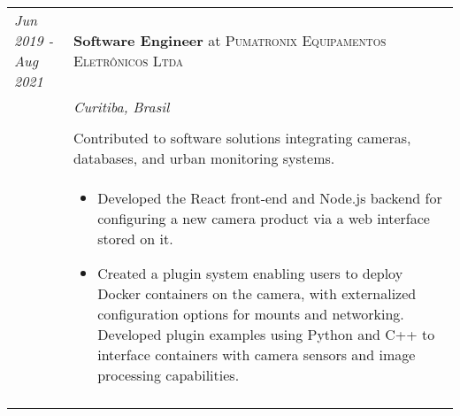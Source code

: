 \documentclass[a4paper,10pt]{article}
\begin{document}
    \begin{tabular}{@{} p{2.8cm} | p{12.2cm} @{}}
        \emph{Jun 2019 - Aug 2021}
        &\textbf{Software Engineer} at \textsc
        {Pumatronix Equipamentos Eletrônicos Ltda} \\

        &\emph
        {Curitiba, Brasil} \\ \\
        &\normalsize
        {
            Contributed to software solutions integrating cameras,
            databases, and urban monitoring systems.
        } \\
        & \begin{itemize}[leftmargin=*]
            \item Developed the React front-end and Node.js backend for
                configuring a new camera product via a web interface
                stored on it.

            \item Created a plugin system enabling users to deploy Docker
                containers on the camera, with externalized configuration
                options for mounts and networking. Developed plugin examples
                using Python and C++ to interface containers with camera
                sensors and image processing capabilities.

        \end{itemize} \\
        \multicolumn{2}{c}{}
    \end{tabular}
\end{document}
